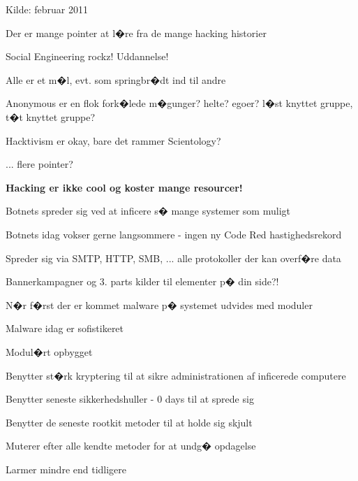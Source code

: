 \documentclass[20pt,landscape,a4paper,footrule]{foils}
\begin{document}
Kilde:
 februar 2011


\begin{list1}
\item Der er mange pointer at l�re fra de mange hacking historier
\item Social Engineering rockz! Uddannelse!
\item Alle er et m�l, evt. som springbr�dt ind til andre
\item Anonymous er en flok fork�lede m�gunger? helte? egoer? l�st knyttet gruppe, t�t knyttet gruppe?
\item Hacktivism er okay, bare det rammer Scientology?
\item ... flere pointer?
\end{list1}

\vskip 2cm
\centerline{\bf Hacking er ikke cool og koster mange resourcer!}





\begin{list1}
\item Botnets spreder sig ved at inficere s� mange systemer som muligt
\item Botnets idag vokser gerne langsommere - ingen ny Code Red hastighedsrekord
\item Spreder sig via SMTP, HTTP, SMB, ... alle protokoller der kan overf�re data
\item Bannerkampagner og 3. parts kilder til elementer p� din side?!
\item N�r f�rst der er kommet malware p� systemet udvides med moduler
\end{list1}


\begin{list1}
\item Malware idag er sofistikeret
\item Modul�rt opbygget
\item Benytter st�rk kryptering til at sikre administrationen af inficerede computere
\item Benytter seneste sikkerhedshuller - 0 days til at sprede sig
\item Benytter de seneste rootkit metoder til at holde sig skjult
\item Muterer efter alle kendte metoder for at undg� opdagelse
\item Larmer mindre end tidligere
\end{list1}
\end{document}
